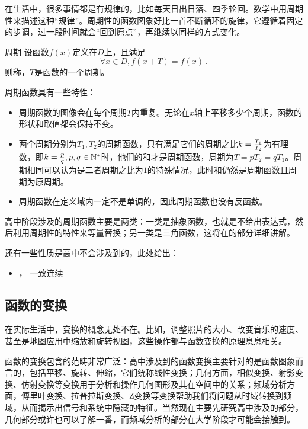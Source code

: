 在生活中，很多事情都是有规律的，比如每天日出日落、四季轮回。数学中用周期性来描述这种“规律”。周期性的函数图象好比一首不断循环的旋律，它遵循着固定的步调，过一段时间就会“回到原点”，再继续以同样的方式变化。

\begin{definition}{周期}
设函数$f(x)$定义在$D$上，且满足
\begin{equation}
\forall x\in D,f(x+T)=f(x)~.
\end{equation}
则称，$T$是函数的一个周期。
\end{definition}


周期函数具有一些特性：
\begin{itemize}
\item 周期函数的图像会在每个周期$T$内重复。无论在$x$轴上平移多少个周期，函数的形状和取值都会保持不变。
\item 两个周期分别为$T_1,T_2$的周期函数，只有满足它们的周期之比$k={T_1\over T_2}$为有理数，即$k={p\over q},p,q\in\mathbb{N}^*$时，他们的和才是周期函数，周期为$T=pT_2=qT_1$。周期相同可以认为是二者周期之比为$1$的特殊情况，此时和仍然是周期函数且周期为原周期。
\item 周期函数在定义域内一定不是单调的，因此周期函数也没有反函数。
\end{itemize}

高中阶段涉及的周期函数主要是两类：一类是抽象函数，也就是不给出表达式，然后利用周期性的特性来等量替换；另一类是三角函数，这将在的部分详细讲解。



还有一些性质是高中不会涉及到的，此处给出：
\begin{itemize}
\item {}， 一致连续
\end{itemize}

\subsection{函数的变换}

在实际生活中，变换的概念无处不在。比如，调整照片的大小、改变音乐的速度、甚至是地图应用中缩放和旋转视图，这些操作都与函数变换的原理息息相关。

函数的变换包含的范畴非常广泛：高中涉及到的函数变换主要针对的是函数图象而言的，包括平移、旋转、伸缩，它们统称线性变换；几何方面，相似变换、射影变换、仿射变换等变换用于分析和操作几何图形及其在空间中的关系；频域分析方面，傅里叶变换、拉普拉斯变换、Z变换等变换帮助我们将问题从时域转换到频域，从而揭示出信号和系统中隐藏的特征。当然现在主要先研究高中涉及的部分，几何部分或许也可以了解一番，而频域分析的部分在大学阶段才可能会接触到。

